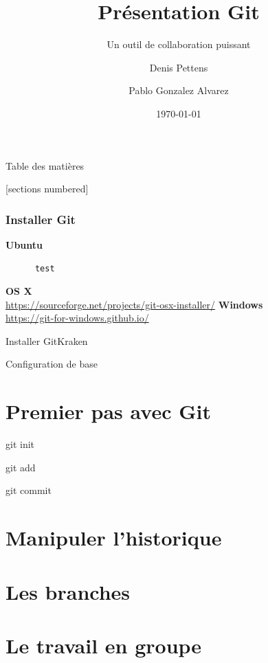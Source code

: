 \documentclass{beamer}
\title{Présentation Git}
\subtitle{Un outil de collaboration puissant}
\date{\today}
\author{Denis Pettens \and Pablo Gonzalez Alvarez}
\institute{Louvain-li-Nux}
\begin{document}
\maketitle

\begin{frame}{Table des matières}

[sections numbered]
\tableofcontents[hideallsubsections]

\end{frame}
\begin{frame}[fragile]
     \frametitle{Installer Git}
      \textbf{Ubuntu}\\
      \begin{lstlisting}
      test
      \end{lstlisting}
      \textbf{OS X}\\
          \url{https://sourceforge.net/projects/git-osx-installer/}
      \textbf{Windows}\\
          \url{https://git-for-windows.github.io/}
\end{frame}
  \begin{frame}{Installer GitKraken}

  \end{frame}
  \begin{frame}{Configuration de base}

  \end{frame}
  \section{Premier pas avec Git}
  \begin{frame}{git init}

  \end{frame}
  \begin{frame}{git add}

  \end{frame}
  \begin{frame}{git commit}

  \end{frame}
  \section{Manipuler l'historique}
  \section{Les branches}
  \section{Le travail en groupe}


\end{document}
